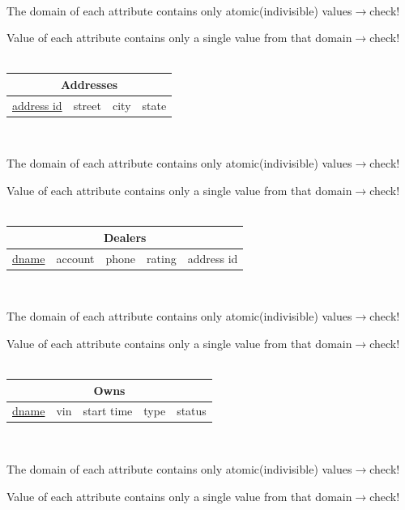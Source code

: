 \documentclass[12pt]{article}
\begin{document}
~\\
\par The domain of each attribute contains only atomic(indivisible) values\hfill $\rightarrow$check!
\par Value of each attribute contains only a single value from that domain\hfill $\rightarrow$check!\\
~\\
\begin{tabularx}{\textwidth}{|X|X|X|X|}
\hline
\multicolumn{4}{|c|}{\cellcolor{green!25}Addresses}\\\hline
\underline{address id} & street & city & state\\\hline
\end{tabularx}
~\\
\par The domain of each attribute contains only atomic(indivisible) values\hfill $\rightarrow$check!
\par Value of each attribute contains only a single value from that domain\hfill $\rightarrow$check!\\
~\\
\begin{tabularx}{\textwidth}{|X|X|X|X|X|}
\hline
\multicolumn{5}{|c|}{Dealers}\\\hline
\underline{dname} & account & phone & rating & \cellcolor{green!25}address id\\\hline
\end{tabularx}
~\\
\par The domain of each attribute contains only atomic(indivisible) values\hfill $\rightarrow$check!
\par Value of each attribute contains only a single value from that domain\hfill $\rightarrow$check!\\
~\\
\begin{tabularx}{\textwidth}{|X|X|X|X|X|}
\hline
\multicolumn{5}{|c|}{Owns}\\\hline
\underline{dname} & vin & start time & type & status\\\hline
\end{tabularx}
~\\
\par The domain of each attribute contains only atomic(indivisible) values\hfill $\rightarrow$check!
\par Value of each attribute contains only a single value from that domain\hfill $\rightarrow$check!\\
\end{document}
